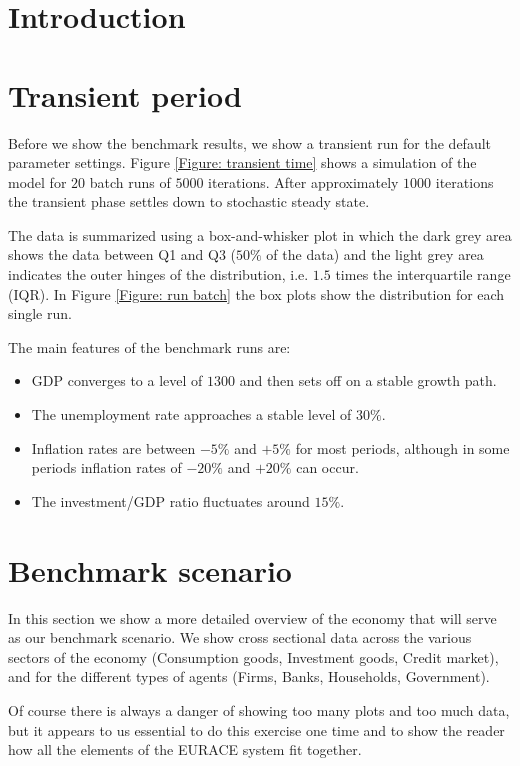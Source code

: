 
\section{Introduction}

\section{Transient period}
Before we show the benchmark results, we show a transient run for the default parameter settings.
Figure \ref{Figure: transient time} shows a simulation of the model for $20$ batch runs of $5000$ iterations.
After approximately $1000$ iterations the transient phase settles down to stochastic steady state.

The data is summarized using a box-and-whisker plot in which the dark grey area shows the data between Q1 and Q3 ($50\%$ of the data) and
 the light grey area indicates the outer hinges of the distribution, i.e. $1.5$ times the interquartile range (IQR).
In Figure \ref{Figure: run batch} the box plots show the distribution for each single run.

\bigskip
The main features of the benchmark runs are:
\begin{itemize}
\item GDP converges to a level of $1300$ and then sets off on a stable growth path.
\item The unemployment rate approaches a stable level of $30\%$.
\item Inflation rates are between $-5\%$ and $+5\%$ for most periods,
although in some periods inflation rates of $-20\%$ and $+20\%$ can occur.
\item The investment/GDP ratio fluctuates around $15\%$.
\end{itemize}

\section{Benchmark scenario}
In this section we show a more detailed overview of the economy that will serve as our benchmark scenario.
We show cross sectional data across the various sectors of the economy (Consumption goods, Investment goods, Credit market),
and for the different types of agents (Firms, Banks, Households, Government). 

Of course there is always a danger of showing too many plots and too much data,
but it appears to us essential to do this exercise one time and to show the reader how
all the elements of the EURACE system fit together.

